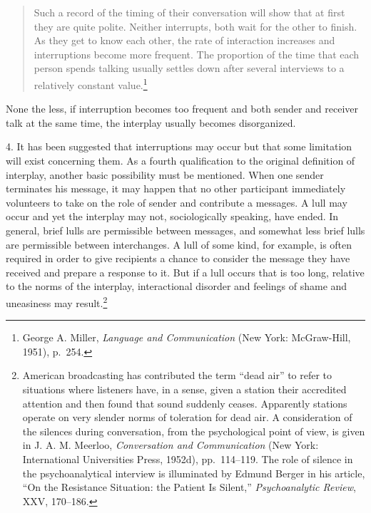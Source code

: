 \documentclass[twoside,symmetric,nobib,justified]{tufte-book}
\begin{document}
\begin{quote}
Such a record of the timing of their conversation will show that at
first they are quite polite. Neither interrupts, both wait for the other
to finish. As they get to know each other, the rate of interaction
increases and interruptions become more frequent. The proportion of the
time that each person spends talking usually settles down after several
interviews to a relatively constant value.\footnote{George A. Miller,
  \emph{Language and Communication} (New York: McGraw-Hill, 1951),
  p.~254.}
\end{quote}

\noindent None the less, if interruption becomes too frequent and both sender and
receiver talk at the same time, the interplay usually becomes
disorganized.

4. It has been suggested that interruptions may occur but that some
limitation will exist concerning them. As a fourth qualification to the
original definition of interplay, another basic possibility must be
mentioned. When one sender terminates his message, it may happen that no
other participant immediately volunteers to take on the role of sender
and contribute a messages. A lull may occur and yet the interplay may
not, sociologically speaking, have ended. In general, brief lulls are
permissible between messages, and somewhat less brief lulls are
permissible between interchanges. A lull of some kind, for example, is
often required in order to give recipients a chance to consider the
message they have received and prepare a response to it. But if a lull
occurs that is too long, relative to the norms of the interplay,
interactional disorder and feelings of shame and uneasiness may
result.\footnote{American broadcasting has contributed the term ``dead
  air'' to refer to situations where listeners have, in a sense, given a
  station their accredited attention and then found that sound suddenly
  ceases. Apparently stations operate on very slender norms of
  toleration for dead air. A consideration of the silences during
  conversation, from the psychological point of view, is given in J. A.
  M. Meerloo, \emph{Conversation and Communication} (New York:
  International Universities Press, 1952d), pp.~114--119. The role of
  silence in the psychoanalytical interview is illuminated by Edmund
  Berger in his article, ``On the Resistance Situation: the Patient Is
  Silent,'' \emph{Psychoanalytic Review}, XXV, 170--186.}

\enlargethispage{\baselineskip}
\end{document}
